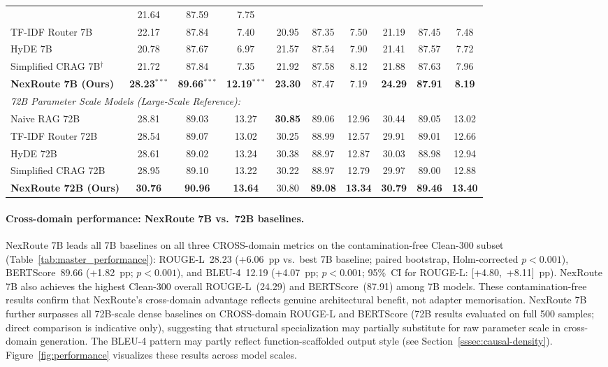 \documentclass[a4paper,fleql]{cas-sc}
\begin{document}
\begin{center}
{\begin{tabular}{lccccccccc}
  & 21.64 & 87.59 & 7.75 \\
TF-IDF Router 7B
  & 22.17 & 87.84 & 7.40
  & 20.95 & 87.35 & 7.50
  & 21.19 & 87.45 & 7.48 \\
HyDE 7B
  & 20.78 & 87.67 & 6.97
  & 21.57 & 87.54 & 7.90
  & 21.41 & 87.57 & 7.72 \\
Simplified CRAG 7B$^\dagger$
  & 21.72 & 87.84 & 7.35
  & 21.92 & 87.58 & 8.12
  & 21.88 & 87.63 & 7.96 \\
\textbf{NexRoute 7B (Ours)}
  & \textbf{28.23}$^{***}$ & \textbf{89.66}$^{***}$ & \textbf{12.19}$^{***}$
  & \textbf{23.30} & 87.47 & 7.19
  & \textbf{24.29} & \textbf{87.91} & \textbf{8.19} \\
\midrule
\multicolumn{10}{l}{\textit{72B Parameter Scale Models (Large-Scale Reference):}} \\
Naive RAG 72B
  & 28.81 & 89.03 & 13.27
  & \textbf{30.85} & 89.06 & 12.96
  & 30.44 & 89.05 & 13.02 \\
TF-IDF Router 72B
  & 28.54 & 89.07 & 13.02
  & 30.25 & 88.99 & 12.57
  & 29.91 & 89.01 & 12.66 \\
HyDE 72B
  & 28.61 & 89.02 & 13.24
  & 30.38 & 88.97 & 12.87
  & 30.03 & 88.98 & 12.94 \\
Simplified CRAG 72B
  & 28.95 & 89.10 & 13.22
  & 30.22 & 88.97 & 12.79
  & 29.97 & 89.00 & 12.88 \\
\textbf{NexRoute 72B (Ours)}
  & \textbf{30.76} & \textbf{90.96} & \textbf{13.64}
  & 30.80 & \textbf{89.08} & \textbf{13.34}
  & \textbf{30.79} & \textbf{89.46} & \textbf{13.40} \\
\bottomrule
\end{tabular}%
}
\endgroup
\end{center}
\vspace{6pt plus 4pt minus 3pt}

\paragraph{Cross-domain performance: NexRoute 7B vs.\ 72B baselines.}
NexRoute 7B leads all 7B baselines on all three CROSS-domain metrics on the contamination-free Clean-300 subset (Table~\ref{tab:master_performance}): ROUGE-L~28.23 (+6.06~pp vs.\ best 7B baseline; paired bootstrap, Holm-corrected $p{<}0.001$), BERTScore~89.66 (+1.82~pp; $p{<}0.001$), and BLEU-4~12.19 (+4.07~pp; $p{<}0.001$; 95\%~CI for ROUGE-L: [+4.80,~+8.11]~pp). NexRoute 7B also achieves the highest Clean-300 overall ROUGE-L~(24.29) and BERTScore~(87.91) among 7B models. These contamination-free results confirm that NexRoute's cross-domain advantage reflects genuine architectural benefit, not adapter memorisation. NexRoute 7B further surpasses all 72B-scale dense baselines on CROSS-domain ROUGE-L and BERTScore (72B results evaluated on full 500 samples; direct comparison is indicative only), suggesting that structural specialization may partially substitute for raw parameter scale in cross-domain generation. The BLEU-4 pattern may partly reflect function-scaffolded output style (see Section~\ref{sssec:causal-density}).
Figure~\ref{fig:performance} visualizes these results across model scales.
\end{document}
